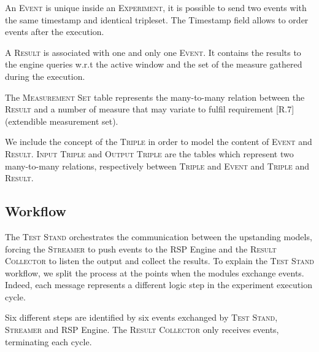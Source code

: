 An \textsc{Event} is unique inside an \textsc{Experiment}, it is possible to send two events with the same timestamp and identical tripleset. The Timestamp field allows to order events after the execution.

A \textsc{Result} is associated with one and only one \textsc{Event}. It contains the results to the engine queries w.r.t the active window and the set of the measure gathered during the execution. 

The \textsc{Measurement Set} table represents the many-to-many relation between the \textsc{Result} and a number of measure that may variate  to fulfil requirement [R.7] (extendible measurement set). 

We include the concept of the \textsc{Triple} in order to model the content of \textsc{Event} and \textsc{Result}. \textsc{Input Triple} and \textsc{Output Triple} are the tables which represent two many-to-many relations, respectively between \textsc{Triple} and \textsc{Event} and \textsc{Triple}  and \textsc{Result}.

\subsection{Workflow}\label{sec:test-stand-workflow}

\noindent The \textsc{Test Stand} orchestrates the communication between the upstanding models, forcing the \textsc{Streamer} to push events to the RSP Engine and the \textsc{Result Collector} to listen the output and collect the results. To explain the \textsc{Test Stand} workflow, we split the process at the points when the modules exchange events. Indeed, each message represents a different logic step in the experiment execution cycle.

Six different steps are identified by six events exchanged by \textsc{Test Stand}, \textsc{Streamer} and RSP Engine. The \textsc{Result Collector} only receives events, terminating each cycle.

